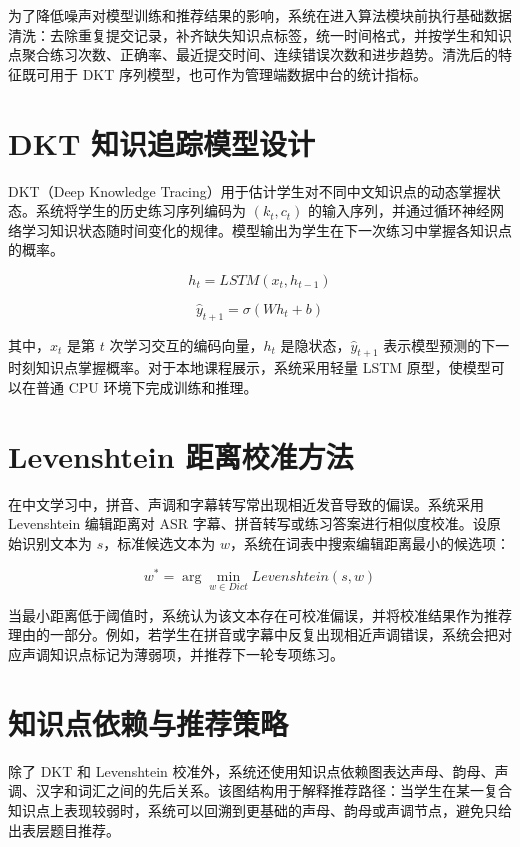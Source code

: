 为了降低噪声对模型训练和推荐结果的影响，系统在进入算法模块前执行基础数据清洗：去除重复提交记录，补齐缺失知识点标签，统一时间格式，并按学生和知识点聚合练习次数、正确率、最近提交时间、连续错误次数和进步趋势。清洗后的特征既可用于 DKT 序列模型，也可作为管理端数据中台的统计指标。

\section{DKT 知识追踪模型设计}

DKT（Deep Knowledge Tracing）用于估计学生对不同中文知识点的动态掌握状态。系统将学生的历史练习序列编码为 $(k_t, c_t)$ 的输入序列，并通过循环神经网络学习知识状态随时间变化的规律。模型输出为学生在下一次练习中掌握各知识点的概率。

\begin{equation}
h_t = LSTM(x_t, h_{t-1})
\end{equation}

\begin{equation}
\hat{y}_{t+1} = \sigma(W h_t + b)
\end{equation}

其中，$x_t$ 是第 $t$ 次学习交互的编码向量，$h_t$ 是隐状态，$\hat{y}_{t+1}$ 表示模型预测的下一时刻知识点掌握概率。对于本地课程展示，系统采用轻量 LSTM 原型，使模型可以在普通 CPU 环境下完成训练和推理。

\section{Levenshtein 距离校准方法}

在中文学习中，拼音、声调和字幕转写常出现相近发音导致的偏误。系统采用 Levenshtein 编辑距离对 ASR 字幕、拼音转写或练习答案进行相似度校准。设原始识别文本为 $s$，标准候选文本为 $w$，系统在词表中搜索编辑距离最小的候选项：

\begin{equation}
w^* = \arg\min_{w \in Dict} Levenshtein(s, w)
\end{equation}

当最小距离低于阈值时，系统认为该文本存在可校准偏误，并将校准结果作为推荐理由的一部分。例如，若学生在拼音或字幕中反复出现相近声调错误，系统会把对应声调知识点标记为薄弱项，并推荐下一轮专项练习。

\section{知识点依赖与推荐策略}

除了 DKT 和 Levenshtein 校准外，系统还使用知识点依赖图表达声母、韵母、声调、汉字和词汇之间的先后关系。该图结构用于解释推荐路径：当学生在某一复合知识点上表现较弱时，系统可以回溯到更基础的声母、韵母或声调节点，避免只给出表层题目推荐。

